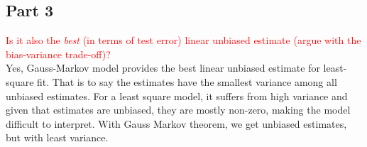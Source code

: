 \documentclass{article}[a4paper]
\begin{document}
\subsection*{Part 3}
\textcolor{red}{Is it also the \textit{best} (in terms of test error) linear unbiased estimate (argue with the bias-variance trade-off)?}\\
Yes, Gauss-Markov model provides the best linear unbiased estimate for least-square fit. That is to say the estimates have the smallest variance among all unbiased estimates. For a least square model, it suffers from high variance and given that estimates are unbiased, they are mostly non-zero, making the model difficult to interpret. With Gauss Markov theorem, we get unbiased estimates, but with least variance.



\end{document}
